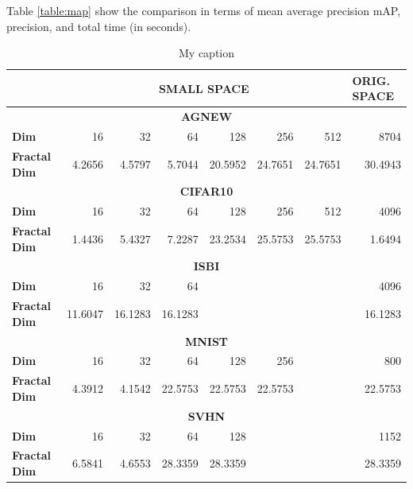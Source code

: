 \documentclass[conference]{IEEEtran}
\begin{document}
Table  \ref{table:map} show the comparison in terms of mean average precision mAP, precision, and total time (in seconds).


\begin{table}[ht]
\centering
\caption{My caption}
\label{my-label}
\begin{tabular}{|l|r|r|r|r|r|r|r|}
\hline
                     & \multicolumn{6}{c|}{\textbf{SMALL SPACE}}                 & \multicolumn{1}{l|}{\textbf{ORIG. SPACE}} \\ \hline
\multicolumn{8}{|c|}{\textbf{AGNEW}}                                                                                         \\ \hline
\textbf{Dim}         & 16      & 32      & 64      & 128     & 256     & 512     & 8704                                      \\ \hline
\textbf{Fractal Dim} & 4.2656  & 4.5797  & 5.7044  & 20.5952 & 24.7651 & 24.7651 & 30.4943                                   \\ \hline
\multicolumn{8}{|c|}{\textbf{CIFAR10}}                                                                                       \\ \hline
\textbf{Dim}         & 16      & 32      & 64      & 128     & 256     & 512     & 4096                                      \\ \hline
\textbf{Fractal Dim} & 1.4436  & 5.4327  & 7.2287  & 23.2534 & 25.5753 & 25.5753 & 1.6494                                    \\ \hline
\multicolumn{8}{|c|}{\textbf{ISBI}}                                                                                          \\ \hline
\textbf{Dim}         & 16      & 32      & 64      &         &         &         & 4096                                      \\ \hline
\textbf{Fractal Dim} & 11.6047 & 16.1283 & 16.1283 &         &         &         & 16.1283                                   \\ \hline
\multicolumn{8}{|c|}{\textbf{MNIST}}                                                                                         \\ \hline
\textbf{Dim}         & 16      & 32      & 64      & 128     & 256     &         & 800                                       \\ \hline
\textbf{Fractal Dim} & 4.3912  & 4.1542  & 22.5753 & 22.5753 & 22.5753 &         & 22.5753                                   \\ \hline
\multicolumn{8}{|c|}{\textbf{SVHN}}                                                                                          \\ \hline
\textbf{Dim}         & 16      & 32      & 64      & 128     &         &         & 1152                                      \\ \hline
\textbf{Fractal Dim} & 6.5841  & 4.6553  & 28.3359 & 28.3359 &         &         & 28.3359                                   \\ \hline
\end{tabular}
\end{table}
\end{document}
